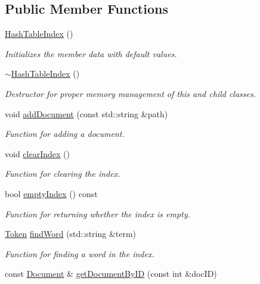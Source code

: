 \subsection*{Public Member Functions}
\begin{DoxyCompactItemize}
\item 
\hyperlink{class_hash_table_index_a13c1c8deae84226c8bef382adf103b53}{Hash\+Table\+Index} ()
\begin{DoxyCompactList}\small\item\em Initializes the member data with default values. \end{DoxyCompactList}\item 
\hyperlink{class_hash_table_index_af4d2eeae8263c353f91140cb2583fb58}{$\sim$\+Hash\+Table\+Index} ()
\begin{DoxyCompactList}\small\item\em Destructor for proper memory management of this and child classes. \end{DoxyCompactList}\item 
void \hyperlink{class_hash_table_index_a5387a8b9f0e585105a79624a93cd6ec0}{add\+Document} (const std\+::string \&path)
\begin{DoxyCompactList}\small\item\em Function for adding a document. \end{DoxyCompactList}\item 
void \hyperlink{class_hash_table_index_a69b31cc0bb54877b628bd67dadc5973f}{clear\+Index} ()
\begin{DoxyCompactList}\small\item\em Function for clearing the index. \end{DoxyCompactList}\item 
bool \hyperlink{class_hash_table_index_a19b62a531429e670b25cd92be4333890}{empty\+Index} () const 
\begin{DoxyCompactList}\small\item\em Function for returning whether the index is empty. \end{DoxyCompactList}\item 
\hyperlink{class_token}{Token} \hyperlink{class_hash_table_index_a3d4c8e0244943cc44f33a35b742f7578}{find\+Word} (std\+::string \&term)
\begin{DoxyCompactList}\small\item\em Function for finding a word in the index. \end{DoxyCompactList}\item 
const \hyperlink{class_document}{Document} \& \hyperlink{class_hash_table_index_ac5cc9451bce6e13739af7c5f154eea0b}{get\+Document\+By\+I\+D} (const int \&doc\+I\+D)

\end{DoxyCompactItemize}
